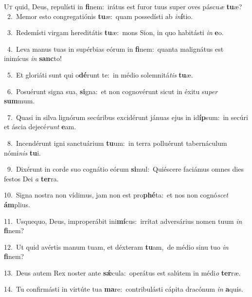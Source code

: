 \lettrine{\initial\textcolor{\initialcolor}{U}}{t} quid, Deus, repulísti in \textbf{fi}\-nem:~\star irátus est furor tuus super oves páscu\textit{æ} \textbf{tu}\-æ?\\
{\numbfont\textcolor{\numbcolor}{~2.}}~Memor esto congregatiónis \textbf{tu}\-æ:~\star quam possedísti ab \textit{in}\-\textbf{í}tio.\par
{\numbfont\textcolor{\numbcolor}{~3.}}~Redemísti virgam hereditátis \textbf{tu}\-æ:~\star mons Sion, in quo habitásti \textit{in} \textbf{e}\-o.\par
{\numbfont\textcolor{\numbcolor}{~4.}}~Leva manus tuas in supérbias eórum in \textbf{fi}\-nem:~\star quanta malignátus est inimícus \textit{in} \textbf{sanc}\-to!\par
{\numbfont\textcolor{\numbcolor}{~5.}}~Et gloriáti sunt qui o\-\textbf{dé}\-runt te:~\star in médio solemnitá\textit{tis} \textbf{tu}\-æ.\par
{\numbfont\textcolor{\numbcolor}{~6.}}~Posuérunt signa sua, \textbf{si}\-gna:~\star et non cognovérunt sicut in éxitu su\textit{per} \textbf{sum}\-mum.\par
{\numbfont\textcolor{\numbcolor}{~7.}}~Quasi in silva lignórum secúribus excidérunt jánuas ejus in id\-\textbf{íp}\-sum:~\star in secúri et áscia dejecé\textit{runt} \textbf{e}\-am.\par
{\numbfont\textcolor{\numbcolor}{~8.}}~Incendérunt igni sanctuárium \textbf{tu}\-um:~\star in terra polluérunt tabernáculum nómi\textit{nis} \textbf{tu}\-i.\par
{\numbfont\textcolor{\numbcolor}{~9.}}~Dixérunt in corde suo cognátio eórum \textbf{si}\-mul:~\star Quiéscere faciámus omnes dies festos Dei \textit{a} \textbf{ter}\-ra.\par
{\numbfont\textcolor{\numbcolor}{10.}}~Signa nostra non vídimus, jam non est pro\-\textbf{phé}\-ta:~\star et nos non cognó\textit{scet} \textbf{ám}\-plius.\par
{\numbfont\textcolor{\numbcolor}{11.}}~Usquequo, Deus, improperábit ini\-\textbf{mí}\-cus:~\star irrítat adversárius nomen tuum \textit{in} \textbf{fi}\-nem?\par
{\numbfont\textcolor{\numbcolor}{12.}}~Ut quid avértis manum tuam, et déxteram \textbf{tu}\-am,~\star de médio sinu tuo \textit{in} \textbf{fi}\-nem?\par
{\numbfont\textcolor{\numbcolor}{13.}}~Deus autem Rex noster ante \textbf{sǽ}\-cula:~\star operátus est salútem in médi\textit{o} \textbf{ter}\-ræ.\par
{\numbfont\textcolor{\numbcolor}{14.}}~Tu confirmásti in virtúte tua \textbf{ma}\-re:~\star contribulásti cápita dracónum \textit{in} \textbf{a}\-quis.\par
